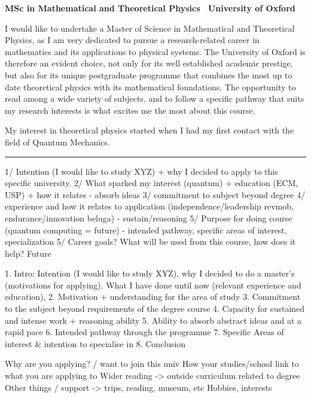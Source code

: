 \documentclass[11pt]{article}
\newcommand*{\NEWLINE}{\vspace{0.75em}}
\begin{document}
\sffamily %

{\bfseries MSc in Mathematical and Theoretical Physics \textemdash~University of Oxford}
\NEWLINE{}\NEWLINE{}


I would like to undertake a Master of Science in Mathematical and Theoretical Physics, as I am very dedicated to pursue a research-related career in mathematics and its applications to physical systems. The University of Oxford is therefore an evident choice, not only for its well established academic prestige, but also for its unique postgraduate programme that combines the most up to date theoretical physics with its mathematical foundations. The opportunity to read among a wide variety of subjects, and to follow a specific pathway that suits my research interests is what excites me the most about this course. \NEWLINE{}


My interest in theoretical physics started when I had my first contact with the field of Quantum Mechanics. 

\noindent\rule{\textwidth}{1pt}

1/ Intention (I would like to study XYZ) + why I decided to apply to this
specific university.
2/ What sparked my interest (quantum) + education (ECM, USP) + how it relates - absorb ideas
3/ commitment to subject beyond degree
4/ experience and how it relates to application (independence/leadership revmob,
endurance/innovation beluga) - sustain/reasoning
5/ Purpose for doing course (quantum computing = future) - intended pathway,
specific areas of interest, specialization
5/ Career goals? What will be used from this course, how does it help? Future


1. Intro: Intention (I would like to study XYZ), why I decided to do a master’s (motivations for applying). What I have done until now (relevant experience and education), 
2. Motivation + understanding for the area of study
3. Commitment to the subject beyond requirements of the degree course
4. Capacity for sustained and intense work + reasoning ability
5. Ability to absorb abstract ideas and at a rapid pace
6. Intended pathway through the programme
7. Specific Areas of interest \& intention to specialise in
8. Conclusion
\NEWLINE{}


Why are you applying? / want to join this univ
How your studies/school link to what you are applying to
Wider reading -> outside curriculum related to degree
Other things / support -> trips, reading, museum, etc
Hobbies, interests \NEWLINE{}
\end{document}
